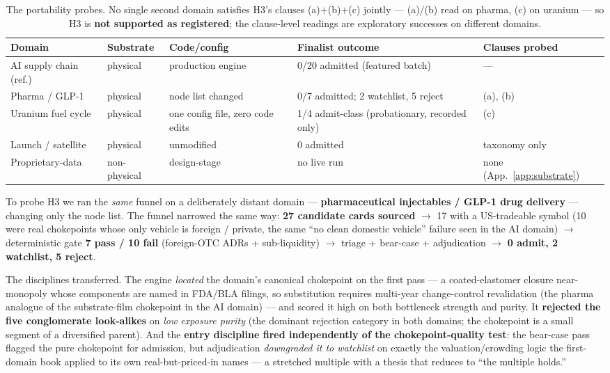 \documentclass[11pt]{article}
\begin{document}
\begin{table}[h]
\centering
\footnotesize
\begin{tabularx}{\linewidth}{@{}lllLl@{}}
\toprule
\textbf{Domain} & \textbf{Substrate} & \textbf{Code/config} & \textbf{Finalist outcome} &
\textbf{Clauses probed} \\
\midrule
AI supply chain (ref.) & physical & production engine & 0/20 admitted (featured batch) & --- \\
Pharma / GLP-1 & physical & node list changed & 0/7 admitted; 2 watchlist, 5 reject & (a), (b) \\
Uranium fuel cycle & physical & one config file, zero code edits & 1/4 admit-class (probationary,
recorded only) & (c) \\
Launch / satellite & physical & unmodified & 0 admitted & taxonomy only \\
Proprietary-data & non-physical & design-stage & no live run & none (App.~\ref{app:substrate}) \\
\bottomrule
\end{tabularx}
\caption{The portability probes. No single second domain satisfies H3's clauses (a)$+$(b)$+$(c)
jointly --- (a)/(b) read on pharma, (c) on uranium --- so H3 is \textbf{not supported as registered};
the clause-level readings are exploratory successes on different domains.}
\label{tab:portability}
\end{table}

To probe H3 we ran the \emph{same} funnel on a deliberately distant domain ---
\textbf{pharmaceutical injectables / GLP-1 drug delivery} --- changing only the
node list. The funnel narrowed the same way: \textbf{27 candidate cards sourced}
$\to$ 17 with a US-tradeable symbol (10 were real chokepoints whose only vehicle
is foreign / private, the same ``no clean domestic vehicle'' failure seen in the
AI domain) $\to$ deterministic gate \textbf{7 pass / 10 fail} (foreign-OTC ADRs +
sub-liquidity) $\to$ triage + bear-case + adjudication $\to$ \textbf{0 admit, 2
watchlist, 5 reject}.

The disciplines transferred. The engine \emph{located} the domain's canonical
chokepoint on the first pass --- a coated-elastomer closure near-monopoly whose
components are named in FDA/BLA filings, so substitution requires multi-year
change-control revalidation (the pharma analogue of the substrate-film chokepoint
in the AI domain) --- and scored it high on both bottleneck strength and purity.
It \textbf{rejected the five conglomerate look-alikes} on \emph{low exposure
purity} (the dominant rejection category in both domains; the chokepoint is a
small segment of a diversified parent). And the \textbf{entry discipline fired
independently of the chokepoint-quality test}: the bear-case pass flagged the pure
chokepoint for admission, but adjudication \emph{downgraded it to watchlist} on
exactly the valuation/crowding logic the first-domain book applied to its own
real-but-priced-in names --- a stretched multiple with a thesis that reduces to
``the multiple holds.''
\end{document}
